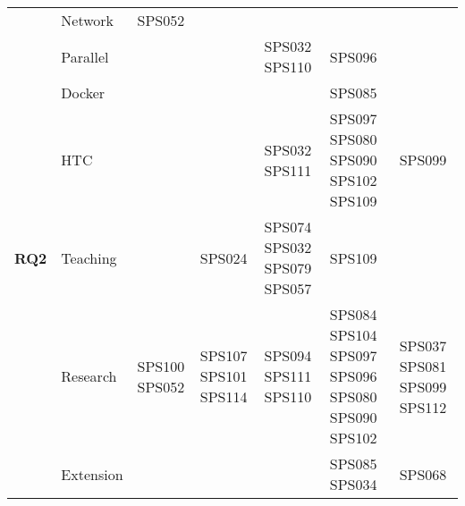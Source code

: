\begin{table*}[htbp]
\begin{tabularx}{\textwidth}{p{0.8cm}p{2.5cm}>{\raggedright\arraybackslash}X>{\raggedright\arraybackslash}X>{\raggedright\arraybackslash}X>{\raggedright\arraybackslash}X>{\raggedright\arraybackslash}X}
		\addlinespace[0.3em]
		                                     & Network                 & SPS052             &                      &                             &                                                  &                             \\
		\addlinespace[0.3em]
		                                     & Parallel                &                    &                      & SPS032 SPS110               & SPS096                                           &                             \\
		\addlinespace[0.3em]
		                                     & Docker                  &                    &                      &                             & SPS085                                           &                             \\
		\addlinespace[0.3em]
		                                     & HTC                     &                    &                      & SPS032 SPS111               & SPS097 SPS080 SPS090 SPS102 SPS109               & SPS099                      \\
		\midrule
		\multirow{0}{*}[1.2em]{\textbf{RQ2}} & Teaching                &                    & SPS024               & SPS074 SPS032 SPS079 SPS057 & SPS109                                           &                             \\
		\addlinespace[0.3em]
		                                     & Research                & SPS100 SPS052      & SPS107 SPS101 SPS114 & SPS094 SPS111 SPS110        & SPS084 SPS104	SPS097 SPS096 SPS080 SPS090 SPS102 & SPS037 SPS081 SPS099 SPS112 \\
		\addlinespace[0.3em]
		                                     & Extension               &                    &                      &                             & SPS085 SPS034                                    & SPS068                      \\
		\bottomrule
	\end{tabularx}
\end{table*}


